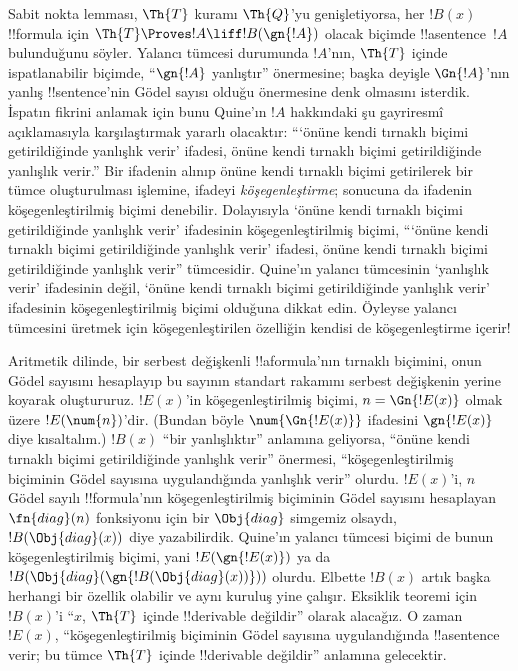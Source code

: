 \documentclass[../../../include/open-logic-section]{subfiles}
\begin{document}


\begin{explain}
Sabit nokta lemması, $\Th{T}$ kuramı $\Th{Q}$'yu genişletiyorsa, her
$!B(x)$ !!{formula} için $\Th{T} \Proves !A \liff !B(\gn{!A})$ olacak
biçimde !!a{sentence}~$!A$ bulunduğunu söyler. Yalancı tümcesi durumunda
$!A$'nın, $\Th{T}$ içinde ispatlanabilir biçimde, ``$\gn{!A}$ yanlıştır''
önermesine; başka deyişle $\Gn{!A}$'nın yanlış !!{sentence}'nin G\"odel
sayısı olduğu önermesine denk olmasını isterdik. İspatın fikrini anlamak için
bunu Quine'ın $!A$ hakkındaki şu gayriresmî açıklamasıyla karşılaştırmak
yararlı olacaktır: ``{}`önüne kendi tırnaklı biçimi getirildiğinde yanlışlık
verir' ifadesi, önüne kendi tırnaklı biçimi getirildiğinde yanlışlık verir.''
Bir ifadenin alınıp önüne kendi tırnaklı biçimi getirilerek bir tümce
oluşturulması işlemine, ifadeyi \emph{köşegenleştirme}; sonucuna da ifadenin
köşegenleştirilmiş biçimi denebilir. Dolayısıyla `önüne kendi tırnaklı biçimi
getirildiğinde yanlışlık verir' ifadesinin köşegenleştirilmiş biçimi,
``{}`önüne kendi tırnaklı biçimi getirildiğinde yanlışlık verir' ifadesi,
önüne kendi tırnaklı biçimi getirildiğinde yanlışlık verir'' tümcesidir.
Quine'ın yalancı tümcesinin `yanlışlık verir' ifadesinin değil, `önüne kendi
tırnaklı biçimi getirildiğinde yanlışlık verir' ifadesinin köşegenleştirilmiş
biçimi olduğuna dikkat edin. Öyleyse yalancı tümcesini üretmek için
köşegenleştirilen özelliğin kendisi de köşegenleştirme içerir!{}

Aritmetik dilinde, bir serbest değişkenli !!a{formula}'nın tırnaklı biçimini,
onun G\"odel sayısını hesaplayıp bu sayının standart rakamını serbest
değişkenin yerine koyarak oluştururuz. $!E(x)$'in köşegenleştirilmiş biçimi,
$n=\Gn{!E(x)}$ olmak üzere $!E(\num{n})$'dir. (Bundan böyle
$\num{\Gn{!E(x)}}$ ifadesini $\gn{!E(x)}$ diye kısaltalım.) $!B(x)$ ``bir
yanlışlıktır'' anlamına geliyorsa, ``önüne kendi tırnaklı biçimi getirildiğinde
yanlışlık verir'' önermesi, ``köşegenleştirilmiş biçiminin G\"odel sayısına
uygulandığında yanlışlık verir'' olurdu. $!E(x)$'i, $n$ G\"odel sayılı
!!{formula}'nın köşegenleştirilmiş biçiminin G\"odel sayısını hesaplayan
$\fn{diag}(n)$ fonksiyonu için bir $\Obj{diag}$ simgemiz olsaydı,
$!B(\Obj{diag}(x))$ diye yazabilirdik. Quine'ın yalancı tümcesi biçimi de
bunun köşegenleştirilmiş biçimi, yani $!E(\gn{!E(x)})$ ya da
$!B(\Obj{diag}(\gn{!B(\Obj{diag}(x))}))$ olurdu. Elbette $!B(x)$ artık başka
herhangi bir özellik olabilir ve aynı kuruluş yine çalışır. Eksiklik teoremi
için $!B(x)$'i ``$x$, $\Th{T}$ içinde !!{derivable} değildir'' olarak
alacağız. O zaman $!E(x)$, ``köşegenleştirilmiş biçiminin G\"odel sayısına
uygulandığında !!a{sentence} verir; bu tümce $\Th{T}$ içinde !!{derivable}
değildir'' anlamına gelecektir.


\end{explain}
\end{document}
